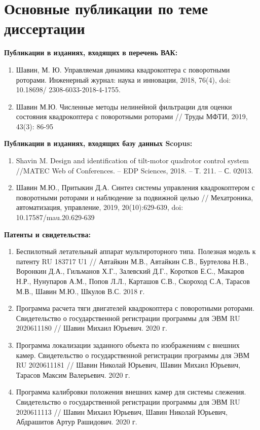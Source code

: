 \chapter{Основные публикации по теме диссертации}

\setlength{\parindent}{0mm}
\textbf{Публикации в изданиях, входящих в перечень ВАК:}

\begin{enumerate}
	\item Шавин, М. Ю. Управляемая динамика квадрокоптера с поворотными роторами. Инженерный журнал: наука и инновации, 2018, 76(4), doi: 10.18698/ 2308-6033-2018-4-1755.
	
	\item  Шавин М.Ю. Численные методы нелинейной фильтрации для оценки состояния квадрокоптера с   поворотными роторами // Труды МФТИ, 2019, 43(3): 86-95
\end{enumerate}
\textbf{Публикации в изданиях, входящих базу данных Scopus:}
\begin{enumerate}
		\item Shavin M. Design and identification of tilt-motor quadrotor control system //MATEC Web of Conferences. – EDP Sciences, 2018. – Т. 211. – С. 02013.
		
		\item  Шавин М.Ю., Притыкин Д.А. Синтез системы управления квадрокоптером с поворотными роторами и наблюдение за подвижной целью // Мехатроника, автоматизация, управление, 2019, 20(10):629-639, doi:\\ 10.17587/mau.20.629-639
\end{enumerate}

\textbf{Патенты и свидетельства:}
\begin{enumerate}
	\item Беспилотный летательный аппарат мультироторного типа. Полезная модель к патенту RU 183717 U1 //
	Автайкин М.В., Автайкин С.В., Буртелова Н.В.,
	Воронкин Д.А., Гильманов Х.Г., Залевский Д.Г.,
	Коротков Е.С., Макаров Н.Р., Нунупаров А.М.,
	Попов Л.Л., Карташов С.В., Скороход С.А,
	Тарасов М.В., Шавин М.Ю., Шкулов В.С. 2018 г.
	
	\item Программа расчета тяги двигателей квадрокоптера с поворотными роторами. Свидетельство о государственной регистрации программы для ЭВМ RU 2020611180 // Шавин Михаил Юрьевич. 2020 г.
	
	\item Программа локализации заданного объекта по изображениям с внешних камер. Свидетельство о государственной регистрации программы для ЭВМ RU 2020611181 // Шавин Николай Юрьевич, Шавин Михаил Юрьевич, Тарасов Максим Валерьевич. 2020 г.
	
	\item Программа калибровки положения внешних камер для системы слежения. Свидетельство о государственной регистрации программы для ЭВМ  RU 2020611113 // Шавин Михаил Юрьевич, Шавин Николай Юрьевич, Абдрашитов Артур Рашидович. 2020 г.
\end{enumerate}

